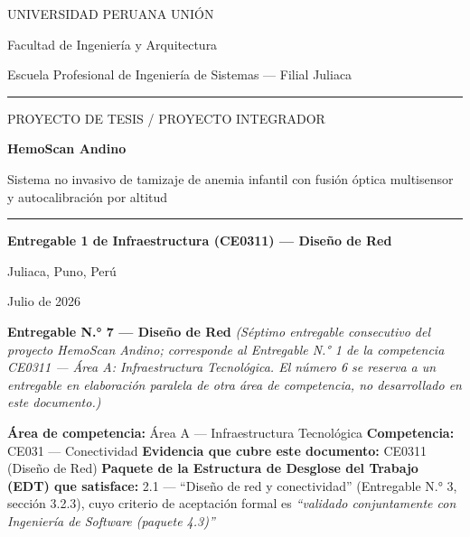 \documentclass[11pt,a4paper]{article}
\begin{document}
\begin{titlepage}
\centering
\vspace*{1.2cm}
{\large UNIVERSIDAD PERUANA UNI\'ON\par}
{\normalsize Facultad de Ingenier\'ia y Arquitectura\par}
{\normalsize Escuela Profesional de Ingenier\'ia de Sistemas --- Filial Juliaca\par}
\vspace{0.5cm}
\rule{0.6\linewidth}{0.4pt}
\vspace{1.6cm}

{\large PROYECTO DE TESIS / PROYECTO INTEGRADOR\par}
\vspace{1.0cm}
{\huge\bfseries HemoScan Andino\par}
\vspace{0.6cm}
{\Large Sistema no invasivo de tamizaje de anemia infantil con fusi\'on \'optica multisensor y autocalibraci\'on por altitud\par}
\vspace{1.6cm}
\rule{0.6\linewidth}{0.4pt}
\vspace{1.6cm}

{\Large\bfseries Entregable 1 de Infraestructura (CE0311) --- Dise\~no de Red\par}
\vspace{2.0cm}

{\normalsize Juliaca, Puno, Per\'u \par}
{\normalsize Julio de 2026\par}

\vfill
\end{titlepage}

\tableofcontents
\newpage

\textbf{Entregable N.° 7 --- Diseño de Red}
\emph{(Séptimo entregable consecutivo del proyecto HemoScan Andino; corresponde al Entregable N.° 1 de la competencia CE0311 --- Área A: Infraestructura Tecnológica. El número 6 se reserva a un entregable en elaboración paralela de otra área de competencia, no desarrollado en este documento.)}

\textbf{Área de competencia:} Área A --- Infraestructura Tecnológica
\textbf{Competencia:} CE031 --- Conectividad
\textbf{Evidencia que cubre este documento:} CE0311 (Diseño de Red)
\textbf{Paquete de la Estructura de Desglose del Trabajo (EDT) que satisface:} 2.1 --- ``Diseño de red y conectividad'' (Entregable N.° 3, sección 3.2.3), cuyo criterio de aceptación formal es \emph{``validado conjuntamente con Ingeniería de Software (paquete 4.3)''}
\end{document}
